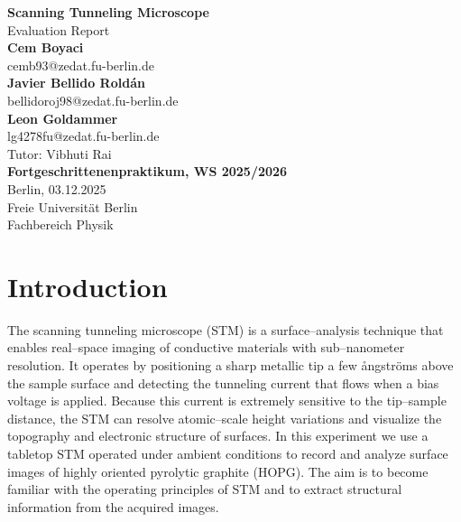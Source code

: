 \documentclass[a4paper]{article}
\begin{document}
\begin{titlepage}
  \thispagestyle{empty}
  \begin{center}

    \vspace*{1cm}
    {\LARGE \textbf{Scanning Tunneling Microscope}}\\[1.2cm]

    {\large Evaluation Report}\\[2cm]

    \large
    \textbf{Cem Boyaci}\\[-1mm]
    {cemb93@zedat.fu-berlin.de}\\[1cm]

    \textbf{Javier Bellido Roldán}\\[-1mm]
    {bellidoroj98@zedat.fu-berlin.de}\\[1cm]

    \textbf{Leon Goldammer}\\[-1mm]
    {lg4278fu@zedat.fu-berlin.de}\\[6cm]

    \normalsize
    {Tutor: Vibhuti Rai}\\[1.2cm]

    \textbf{Fortgeschrittenenpraktikum, WS 2025/2026}\\
    Berlin, 03.12.2025\\
    Freie Universität Berlin\\
    Fachbereich Physik

  \end{center}
\end{titlepage}

\clearpage
\renewcommand*\contentsname{\huge Contents}
{
  \tableofcontents
  \clearpage
}

\newpage
\setcounter{page}{1}

\section{Introduction}

The scanning tunneling microscope (STM) is a surface–analysis technique that enables real–space imaging of conductive materials with sub–nanometer resolution.
It operates by positioning a sharp metallic tip a few ångströms above the sample surface and detecting the tunneling current that flows when a bias voltage is applied.
Because this current is extremely sensitive to the tip–sample distance, the STM can resolve atomic–scale height variations and visualize the topography and electronic structure of surfaces.
In this experiment we use a tabletop STM operated under ambient conditions to record and analyze surface images of highly oriented pyrolytic graphite (HOPG).
The aim is to become familiar with the operating principles of STM and to extract structural information from the acquired images.
\end{document}
